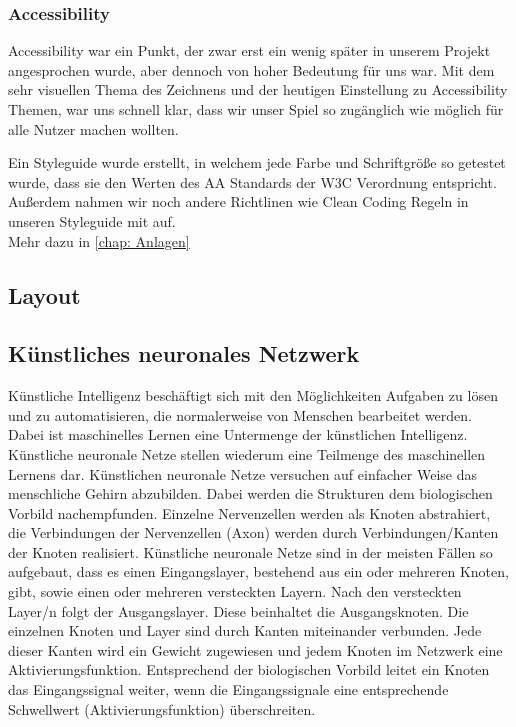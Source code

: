 \documentclass[11pt]{article}
\begin{document}
\subsubsection{Accessibility}

Accessibility war ein Punkt, der zwar erst ein wenig später in unserem Projekt angesprochen wurde, aber dennoch von hoher Bedeutung für uns war. Mit dem sehr visuellen Thema des Zeichnens und der heutigen Einstellung zu Accessibility Themen, war uns schnell klar, dass wir unser Spiel so zugänglich wie möglich für alle Nutzer machen wollten.

Ein Styleguide wurde erstellt, in welchem jede Farbe und Schriftgröße so getestet wurde, dass sie den Werten des AA Standards der W3C Verordnung entspricht. Außerdem nahmen wir noch andere Richtlinen wie Clean Coding Regeln in unseren Styleguide mit auf.\\
Mehr dazu in \autoref{chap: Anlagen} 

\subsection{Layout}
\subsection{Künstliches neuronales Netzwerk}

Künstliche Intelligenz beschäftigt sich mit den Möglichkeiten Aufgaben zu lösen und zu automatisieren, die normalerweise von Menschen bearbeitet werden. Dabei ist maschinelles Lernen eine Untermenge der künstlichen Intelligenz. Künstliche neuronale Netze stellen wiederum eine Teilmenge des maschinellen Lernens dar. Künstlichen neuronale Netze versuchen auf einfacher Weise das menschliche Gehirn abzubilden. Dabei werden die Strukturen dem biologischen Vorbild nachempfunden. Einzelne Nervenzellen werden als Knoten abstrahiert, die Verbindungen der Nervenzellen (Axon) werden durch Verbindungen/Kanten der Knoten realisiert. Künstliche neuronale Netze sind in der meisten Fällen so aufgebaut, dass es einen Eingangslayer, bestehend aus ein oder mehreren Knoten, gibt, sowie einen oder mehreren versteckten Layern. Nach den versteckten Layer/n folgt der Ausgangslayer. Diese beinhaltet die Ausgangsknoten. Die einzelnen Knoten und Layer sind durch Kanten miteinander verbunden. Jede dieser Kanten wird ein Gewicht zugewiesen und jedem Knoten im Netzwerk eine Aktivierungsfunktion. Entsprechend der biologischen Vorbild leitet ein Knoten das Eingangssignal weiter, wenn die Eingangssignale eine entsprechende Schwellwert (Aktivierungsfunktion) überschreiten.
\end{document}
